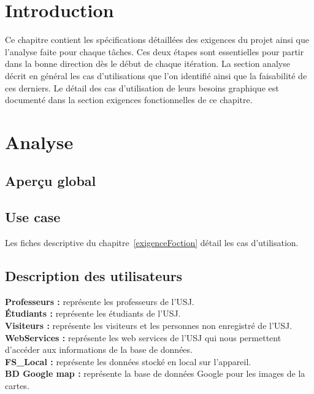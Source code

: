\section{Introduction}
Ce chapitre contient les spécifications détaillées des exigences du projet ainsi que l'analyse faite pour chaque tâches. Ces deux étapes sont essentielles pour partir dans la bonne direction dès le début de chaque itération.  La section analyse décrit en général les cas d'utilisations que l'on identifié ainsi que la faisabilité de ces derniers. Le détail des cas d'utilisation de leurs besoins graphique est documenté dans la section exigences fonctionnelles de ce chapitre.
\section{Analyse}
	\subsection{ Aperçu global}
	\subsection{Use case}
	 Les fiches descriptive du chapitre~\ref{exigenceFoction} détail les cas d'utilisation.
	\subsection{Description des utilisateurs}
		\textbf{Professeurs :} représente les professeurs de l'USJ.\\[0.2cm]
		\textbf{Étudiants :} représente les étudiants de l'USJ.\\[0.2cm]
		\textbf{Visiteurs :} représente les visiteurs et les personnes non enregistré de l'USJ.\\[0.2cm]
		\textbf{WebServices :} représente les web services de l'\gls{USJ} qui nous permettent d'accéder aux informations de la base de données.\\[0.2cm]
		\textbf{FS\_Local :} représente les données stocké en local sur l'appareil.\\[0.2cm]
		\textbf{BD Google map :} représente la base de données Google pour les images de la cartes.\\[0.2cm]
		

